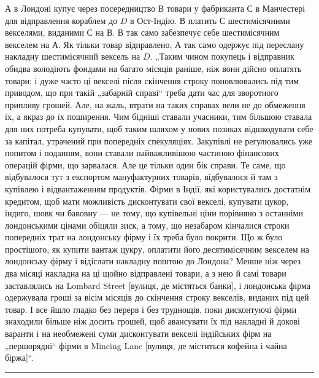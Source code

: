 $А$ в Лондоні купує через посередництво $В$ товари у фабриканта $С$ в Манчестері для відправлення кораблем
до $D$ в Ост-Індію. $В$ платить $С$ шестимісячними векселями, виданими $С$ на $В$. В так само забезпечує себе
шестимісячним
векселем на $А$. Як тільки товар відправлено, $А$ так само одержує під переслану
накладну шестимісячний вексель на $D$. „Таким чином покупець і відправник
обидва володіють фондами на багато місяців раніше, ніж вони дійсно оплатять
товари; і дуже часто ці векселі після скінчення строку поновлювались під тим
приводом, що при такій „забарній справі“ треба дати час для зворотного припливу грошей. Але, на
жаль, втрати на таких справах вели не до обмеження
їх, а якраз до їх поширення. Чим бідніші ставали учасники, тим більшою ставала для них потреба
купувати, щоб таким шляхом у нових позиках відшкодувати
себе за капітал, утрачений при попередніх спекуляціях. Закупівлі не регулювались уже попитом і
поданням, вони ставали найважливішою частиною фінансових
операцій фірми, що зарвалася. Але це тільки один бік справи. Те саме, що відбувалося тут з експортом
мануфактурних товарів, відбувалося й там з купівлею
і відвантаженням продуктів. Фірми в Індії, які користувались достатнім кредитом,
щоб мати можливість дисконтувати свої векселі, купувати цукор, індиго, шовк
чи бавовну — не тому, що купівельні ціни порівняно з останніми лондонськими
цінами обіцяли зиск, а тому, що незабаром кінчалися строки попередніх трат на
лондонську фірму і їх треба було покрити. Що ж було простішого, як купити вантаж цукру, оплатити
його десятимісячним векселем на лондонську фірму і відіслати накладну поштою до Лондона? Менше ніж
через два місяці накладна на
ці щойно відправлені товари, а з нею й самі товари заставлялись на Lombard
Street [вулиця, де містяться банки], і лондонська фірма одержувала гроші за
вісім місяців до скінчення строку векселів, виданих під цей товар. І все йшло
гладко без перерв і без труднощів, поки дисконтуючі фірми знаходили більше
ніж досить грошей, щоб авансувати їх під накладні й докові варанти і на необмежені суми дисконтувати
векселі індійських фірм на „першорядні“ фірми в
Mincing Lane [вулиця, де міститься кофейна і чайна біржа]“.

\pfbreak
